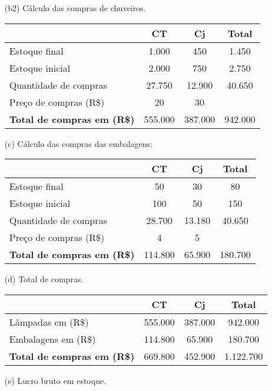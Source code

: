 \documentclass[report]{uftex}
\begin{document}
\begin{itemize}
\item[(b2)] Cálculo das compras de chuveiros.

 \begin{table}[h]
	\centering
	\begin{tabular}{l|c|c|c}
		\hline
		& \textbf{CT} & \textbf{Cj} & \textbf{Total} \\ 
		\hline
		Estoque final & 1.000 & 450 & 1.450 \\
		\hline
		Estoque inicial & 2.000 & 750 & 2.750 \\
		\hline
		Quantidade de compras & 27.750 & 12.900 & 40.650 \\
		\hline
		Preço de compras (R\$) & 20 & 30 & \\
		\hline
		\textbf{Total de compras em (R\$)} & 555.000 & 387.000 & 942.000 \\
	\end{tabular}
\end{table}

\vspace*{2cm}

\item[(c)] Cálculo das compras das embalagens: 

 \begin{table}[h]
	\centering
	\begin{tabular}{l|c|c|c}
		\hline
		& \textbf{CT} & \textbf{Cj} & \textbf{Total} \\ 
		\hline
		Estoque final & 50 & 30 & 80 \\
		\hline
		Estoque inicial & 100 & 50 & 150 \\
		\hline
		Quantidade de compras & 28.700 & 13.180 & 40.650 \\
		\hline
		Preço de compras (R\$) & 4 & 5 & \\
		\hline
		\textbf{Total de compras em (R\$)} & 114.800 & 65.900 & 180.700 \\
	\end{tabular}
\end{table}

\item[(d)] Total de compras.

 \begin{table}[h]
	\centering
	\begin{tabular}{l|c|c|c}
		\hline
		& \textbf{CT} & \textbf{Cj} & \textbf{Total} \\ 
		\hline
		Lâmpadas em (R\$) & 555.000 & 387.000 & 942.000 \\
		\hline
		Embalagens em (R\$) & 114.800 & 65.900 & 180.700 \\
		\hline
		\textbf{Total de compras em (R\$)} & 669.800 & 452.900 & 1.122.700 \\
	\end{tabular}
\end{table}

\item[(e)] Lucro bruto em estoque.
\end{itemize}
\end{document}
